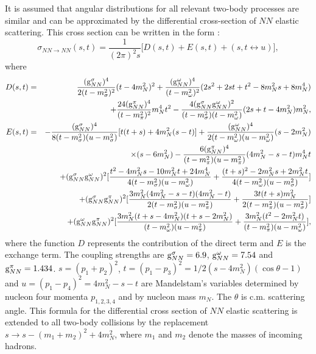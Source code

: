 \hspace{1.0em}It is assumed that angular distributions for all relevant
two-body processes are similar and can be approximated by the
differential cross-section of $NN$ elastic scattering. 
This cross 
 section can be written in the form \cite{URQMD97}:
\begin{equation}
\label{HCS1}
  \sigma_{NN \rightarrow NN}(s,t) = \frac{1}{(2 \pi)^{2} s} \lbrack D(s,t)
  + E(s,t) + (s, t \longleftrightarrow u) \rbrack, 
  \end{equation}
  where
 \begin{eqnarray}
  D(s,t)&=& \frac{({\rm g}_{NN}^{\sigma})^{4}}{2(t-m_{\sigma}^{2})^{2}}
 (t- 4 m_N^{2})^{2} + \frac{({\rm g}_{NN}^{\omega})^{4}}{(t-m_{\omega}^{2})^{2}}
 (2 s^{2} + 2st +t^{2} -8m_N^{2}s +8m_N^{4}) \nonumber \\
  &&  + \frac{24({\rm g}_{NN}^{\pi})^{4}}{(t- m_{\pi}^{2})^{2}} m_N^{4}t^{2}
 - \frac{4({\rm g}_{NN}^{\sigma}{\rm g}_{NN}^{\omega})^{2}}
{(t - m_{\sigma}^{2})(t-m_{\omega}^{2})} (2s + t -4m_N^{2})m_N^{2}, \\
  E(s,t)&=& -\frac{({\rm g}_{NN}^{\sigma})^{4}}{8(t-m_{\sigma}^{2})
 (u-m_{\sigma}^{2})} \lbrack t (t+s) + 4m_N^{2}(s-t) \rbrack
  + \frac{({\rm g}_{NN}^{\omega})^{4}}{2(t-m_{\omega}^{2})(u-m_{\omega}^{2})}
 (s- 2m_N^{2}) \nonumber \\ && \times (s-6m_N^{2})  
    - \frac{6({\rm g}_{NN}^{\pi})^{4}}{(t- m_{\pi}^{2})(u-m_{\pi}^{2})}
  (4m_N^{2}-s -t ) m_N^{4}t \nonumber \\
&& + ({\rm g}_{NN}^{\sigma}{\rm g}_{NN}^{\omega})^{2}
 \lbrack \frac{t^{2} - 4m_N^{2}s -10m_N^{2}t +24m_N^{4}}{4(t-m_{\sigma}^{2})
(u-m_{\omega}^{2})} + \frac{(t+s)^{2} - 2m_N^{2}s + 2m_N^{2}t }{4 (t-m_{\omega}
^{2})(u-m_{\sigma}^{2})}  \rbrack \nonumber \\
  && + ({\rm g}_{NN}^{\sigma}{\rm g}_{NN}^{\pi})^{2}
 \lbrack \frac{3m_N^{2}(4m_N^{2}-s-t)(4m_N^{2}-t)}{2(t-m_{\sigma}^{2})
(u-m_{\pi}^{2})} + \frac{3t(t+s)m_N^{2}}{2 (t-m_{\pi}
^{2})(u-m_{\sigma}^{2})}  \rbrack \nonumber \\
  && + ({\rm g}_{NN}^{\omega}{\rm g}_{NN}^{\pi})^{2}
 \lbrack \frac{3m_N^{2}(t+s-4m_N^{2})(t+s-2m_N^{2})}{(t-m_{\omega}^{2})
(u-m_{\pi}^{2})} + \frac{3m_N^{2}(t^{2}-2m_N^{2}t)}{ (t-m_{\pi}
^{2})(u-m_{\omega}^{2})}  \rbrack, 
  \end{eqnarray}
where the function $D$ represents the contribution of the 
direct term and $E$ is the
exchange term. The coupling strengths are ${\rm g}_{NN}^{\sigma}=6.9$,
${\rm g}_{NN}^{\omega}=7.54$ and ${\rm g}_{NN}^{\pi}=1.434$.
$s=(p_1+p_2)^2$, $t=(p_1-p_3)^2 =1/2(s-4m^2_N)(\cos{\theta} - 1)$
and $u= (p_1 - p_4)^2=4m^2_N - s - t$ are Mandelstam's variables
determined by nucleon four momenta $p_{1,2,3,4}$ and by nucleon mass
$m_N$. The $\theta$ is c.m. scattering angle.
  This formula for the differential cross
section of $NN$ elastic scattering is extended to all two-body 
collisions by the replacement $s\rightarrow s - (m_1+m_2)^2 + 4m^2_N$,
where $m_1$ and $m_2$ denote the masses of incoming hadrons.

